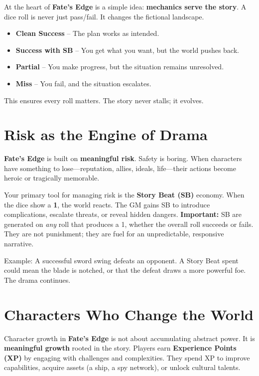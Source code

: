 At the heart of \textbf{Fate's Edge} is a simple idea: \textbf{mechanics serve the story}. A dice roll is never just pass/fail. It changes the fictional landscape.

\begin{itemize}
    \item \textbf{Clean Success} -- The plan works as intended.
    \item \textbf{Success with SB} -- You get what you want, but the world pushes back.
    \item \textbf{Partial} -- You make progress, but the situation remains unresolved.
    \item \textbf{Miss} -- You fail, and the situation escalates.
\end{itemize}

This ensures every roll matters. The story never stalls; it evolves.

\section{Risk as the Engine of Drama}
\label{sec:gm-risk-drama}

\textbf{Fate's Edge} is built on \textbf{meaningful risk}. Safety is boring. When characters have something to lose---reputation, allies, ideals, life---their actions become heroic or tragically memorable.

Your primary tool for managing risk is the \textbf{Story Beat (SB)} economy. When the dice show a \textbf{1}, the world reacts. The GM gains SB to introduce complications, escalate threats, or reveal hidden dangers. \textbf{Important:} SB are generated on \emph{any} roll that produces a 1, whether the overall roll succeeds or fails. They are not punishment; they are fuel for an unpredictable, responsive narrative.

Example: A successful sword swing defeats an opponent. A Story Beat spent could mean the blade is notched, or that the defeat draws a more powerful foe. The drama continues.

\section{Characters Who Change the World}
\label{sec:gm-growth}

Character growth in \textbf{Fate's Edge} is not about accumulating abstract power. It is \textbf{meaningful growth} rooted in the story. Players earn \textbf{Experience Points (XP)} by engaging with challenges and complexities. They spend XP to improve capabilities, acquire assets (a ship, a spy network), or unlock cultural talents.

